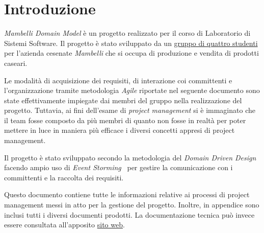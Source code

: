\chapter*{Introduzione}

\emph{Mambelli Domain Model} è un progetto realizzato per il corso di Laboratorio di Sistemi Software.
Il progetto è stato sviluppato da un \href{https://atedeg.dev/about}{gruppo di quattro studenti} per l'azienda cesenate \emph{Mambelli} che si occupa di produzione e vendita di prodotti caseari.

Le modalità di acquisizione dei requisiti, di interazione coi committenti e l'organizzazione tramite metodologia \emph{Agile} riportate nel seguente documento sono state effettivamente impiegate dai membri del gruppo nella realizzazione del progetto. Tuttavia, ai fini dell'esame di \emph{project management} si è immaginato che il team fosse composto da più membri di quanto non fosse in realtà per poter mettere in luce in maniera più efficace i diversi concetti appresi di project management.

Il progetto è stato sviluppato secondo la metodologia del \emph{Domain Driven Design}~\cite{cit:ddd} facendo ampio uso di \emph{Event Storming}~\cite{cit:event-storming} per gestire la comunicazione con i committenti e la raccolta dei requisiti.

Questo documento contiene tutte le informazioni relative ai processi di project management messi in atto per la gestione del progetto. Inoltre, in appendice sono inclusi tutti i diversi documenti prodotti.
La documentazione tecnica può invece essere consultata all'apposito \href{https://atedeg.dev/mdm}{sito web}.
